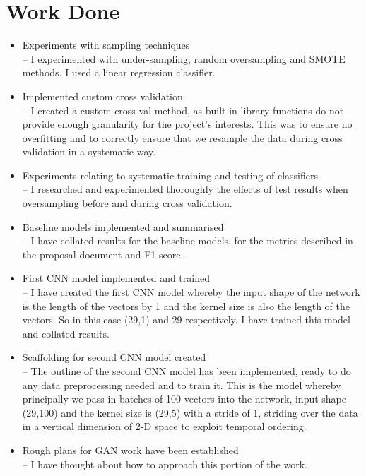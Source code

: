 \documentclass[12pt,a4paper,twoside]{article}
\begin{document}
 \section*{Work Done}
 
 \begin{itemize}
 \item Experiments with sampling techniques \\
 -- I experimented with under-sampling, random oversampling and SMOTE methods. I used a linear regression classifier.
 \item Implemented custom cross validation \\
 -- I created a custom cross-val method, as built in library functions do not provide enough granularity for the project's interests. This was to ensure no overfitting and to correctly ensure that we resample the data during cross validation in a systematic way.
 \item Experiments relating to systematic training and testing of classifiers \\
 -- I researched and experimented thoroughly the effects of test results when oversampling before and during cross validation. 
 \item Baseline models implemented and summarised \\
 -- I have collated results for the baseline models, for the metrics described in the proposal document and F1 score.
 \item First CNN model implemented and trained \\
 -- I have created the first CNN model whereby the input shape of the network is the length of the vectors by 1 and the kernel size is also the length of the vectors. So in this case (29,1) and 29 respectively. I have trained this model and collated results.
 
 \item Scaffolding for second CNN model created \\
 -- The outline of the second CNN model has been implemented, ready to do any data preprocessing needed and to train it. This is the model whereby principally we pass in batches of 100 vectors into the network, input shape (29,100) and the kernel size is (29,5) with a stride of 1, striding over the data in a vertical dimension of 2-D space to exploit temporal ordering. 
 \item Rough plans for GAN work have been established \\
 -- I have thought about how to approach this portion of the work.  
 \end{itemize}
 
\end{document}
